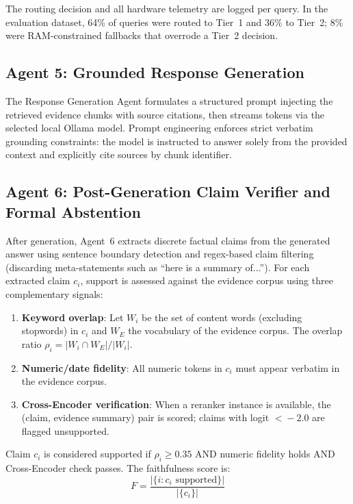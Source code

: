 \documentclass[conference]{IEEEtran}
\begin{document}
The routing decision and all hardware telemetry are logged per query. In
the evaluation dataset, 64\% of queries were routed to Tier~1 and 36\% to
Tier~2; 8\% were RAM-constrained fallbacks that overrode a Tier~2 decision.

\subsection{Agent 5: Grounded Response Generation}
\label{subsec:agent5}

The Response Generation Agent formulates a structured prompt injecting the
retrieved evidence chunks with source citations, then streams tokens via the
selected local Ollama model. Prompt engineering enforces strict verbatim
grounding constraints: the model is instructed to answer solely from the
provided context and explicitly cite sources by chunk identifier.

\subsection{Agent 6: Post-Generation Claim Verifier and Formal Abstention}
\label{subsec:agent6}

After generation, Agent~6 extracts discrete factual claims from the generated
answer using sentence boundary detection and regex-based claim filtering
(discarding meta-statements such as ``here is a summary of...''). For each
extracted claim $c_i$, support is assessed against the evidence corpus using
three complementary signals:

\begin{enumerate}
  \item \textbf{Keyword overlap}: Let $W_i$ be the set of content words
        (excluding stopwords) in $c_i$ and $W_E$ the vocabulary of the
        evidence corpus. The overlap ratio $\rho_i = |W_i \cap W_E| /
        |W_i|$.
  \item \textbf{Numeric/date fidelity}: All numeric tokens in $c_i$ must
        appear verbatim in the evidence corpus.
  \item \textbf{Cross-Encoder verification}: When a reranker instance is
        available, the (claim, evidence summary) pair is scored; claims with
        logit $<\!-2.0$ are flagged unsupported.
\end{enumerate}

Claim $c_i$ is considered supported if $\rho_i \geq 0.35$ AND numeric
fidelity holds AND Cross-Encoder check passes. The faithfulness score is:
\begin{equation}
  F = \frac{|\{i : c_i \text{ supported}\}|}{|\{c_i\}|}
  \label{eq:faithfulness}
\end{equation}
\end{document}
